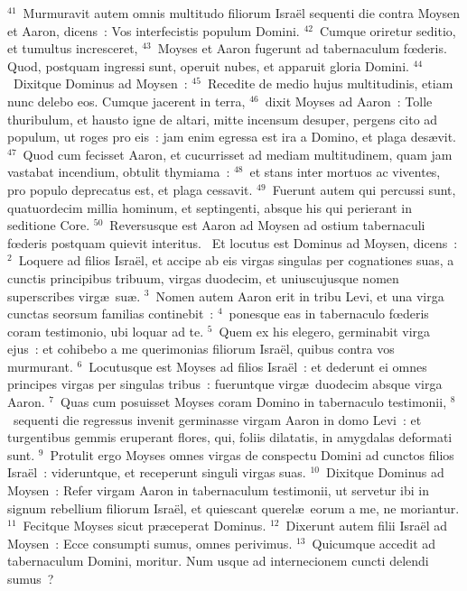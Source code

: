 ${}^{41}$~Murmuravit autem omnis multitudo filiorum Isra\"el sequenti die contra Moysen et Aaron, dicens~: Vos interfecistis populum Domini.
${}^{42}$~Cumque oriretur seditio, et tumultus incresceret,
${}^{43}$~Moyses et Aaron fugerunt ad tabernaculum fœderis. Quod, postquam ingressi sunt, operuit nubes, et apparuit gloria Domini.
${}^{44}$~Dixitque Dominus ad Moysen~:
${}^{45}$~Recedite de medio hujus multitudinis, etiam nunc delebo eos. Cumque jacerent in terra,
${}^{46}$~dixit Moyses ad Aaron~: Tolle thuribulum, et hausto igne de altari, mitte incensum desuper, pergens cito ad populum, ut roges pro eis~: jam enim egressa est ira a Domino, et plaga des\ae vit.
${}^{47}$~Quod cum fecisset Aaron, et cucurrisset ad mediam multitudinem, quam jam vastabat incendium, obtulit thymiama~:
${}^{48}$~et stans inter mortuos ac viventes, pro populo deprecatus est, et plaga cessavit.
${}^{49}$~Fuerunt autem qui percussi sunt, quatuordecim millia hominum, et septingenti, absque his qui perierant in seditione Core.
${}^{50}$~Reversusque est Aaron ad Moysen ad ostium tabernaculi fœderis postquam quievit interitus.
~Et locutus est Dominus ad Moysen, dicens~:
${}^{2}$~Loquere ad filios Isra\"el, et accipe ab eis virgas singulas per cognationes suas, a cunctis principibus tribuum, virgas duodecim, et uniuscujusque nomen superscribes virg\ae\ su\ae .
${}^{3}$~Nomen autem Aaron erit in tribu Levi, et una virga cunctas seorsum familias continebit~:
${}^{4}$~ponesque eas in tabernaculo fœderis coram testimonio, ubi loquar ad te.
${}^{5}$~Quem ex his elegero, germinabit virga ejus~: et cohibebo a me querimonias filiorum Isra\"el, quibus contra vos murmurant.
${}^{6}$~Locutusque est Moyses ad filios Isra\"el~: et dederunt ei omnes principes virgas per singulas tribus~: fueruntque virg\ae\ duodecim absque virga Aaron.
${}^{7}$~Quas cum posuisset Moyses coram Domino in tabernaculo testimonii,
${}^{8}$~sequenti die regressus invenit germinasse virgam Aaron in domo Levi~: et turgentibus gemmis eruperant flores, qui, foliis dilatatis, in amygdalas deformati sunt.
${}^{9}$~Protulit ergo Moyses omnes virgas de conspectu Domini ad cunctos filios Isra\"el~: videruntque, et receperunt singuli virgas suas.
${}^{10}$~Dixitque Dominus ad Moysen~: Refer virgam Aaron in tabernaculum testimonii, ut servetur ibi in signum rebellium filiorum Isra\"el, et quiescant querel\ae\ eorum a me, ne moriantur.
${}^{11}$~Fecitque Moyses sicut pr\ae ceperat Dominus.
${}^{12}$~Dixerunt autem filii Isra\"el ad Moysen~: Ecce consumpti sumus, omnes perivimus.
${}^{13}$~Quicumque accedit ad tabernaculum Domini, moritur. Num usque ad internecionem cuncti delendi sumus~?
